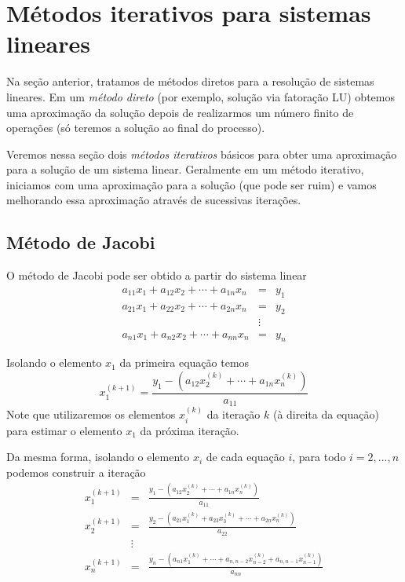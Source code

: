 \section{Métodos iterativos para sistemas lineares}
Na seção anterior, tratamos de métodos diretos para a resolução de sistemas lineares. Em um \emph{método direto} (por exemplo, solução via fatoração LU) obtemos uma aproximação da solução depois de realizarmos um número finito de operações (só teremos a solução ao final do processo).

Veremos nessa seção dois \emph{métodos iterativos} básicos para obter uma aproximação para a solução de um sistema linear. Geralmente em um método iterativo, iniciamos com uma aproximação para a solução (que pode ser ruim) e vamos melhorando essa aproximação através de sucessivas iterações.

\subsection{Método de Jacobi}
O método de Jacobi pode ser obtido a partir do sistema linear
\begin{eqnarray}
a_{11}x_1+a_{12}x_2+\cdots+a_{1n}x_n&=&y_1\\
a_{21}x_1+a_{22}x_2+\cdots+a_{2n}x_n&=&y_2\\
&\vdots&     \\
a_{n1}x_1+a_{n2}x_2+\cdots+a_{nn}x_n&=& y_n
\end{eqnarray}

Isolando o elemento $x_1$ da primeira equação temos
\begin{equation}
x_1^{(k+1)}= \frac{y_1 - \left(a_{12}x_2^{(k)}+\cdots+a_{1n}x_n^{(k)}\right)}{a_{11}}
\end{equation}
Note que utilizaremos os elementos $x_i^{(k)}$ da iteração $k$ (à direita da equação) para estimar o elemento $x_1$ da próxima iteração.

Da mesma forma, isolando o elemento $x_i$ de cada equação $i$, para todo $i=2,...,n$ podemos construir a iteração
\begin{eqnarray}
x_1^{(k+1)}&=&\frac{y_1 - \left(a_{12}x_2^{(k)}+\cdots+a_{1n}x_n^{(k)}\right)}{a_{11}}\\
x_2^{(k+1)}&=&\frac{y_2 - \left(a_{21}x_1^{(k)}+a_{23}x_3^{(k)}+\cdots+a_{2n}x_n^{(k)}\right)}{a_{22}}\\
&\vdots&\\
x_n^{(k+1)}&=&\frac{y_n - \left(a_{n1}x_1^{(k)}+\cdots+a_{n,n-2}x_{n-2}^{(k)}+a_{n,n-1}x_{n-1}^{(k)}\right)}{a_{nn}}
\end{eqnarray}

